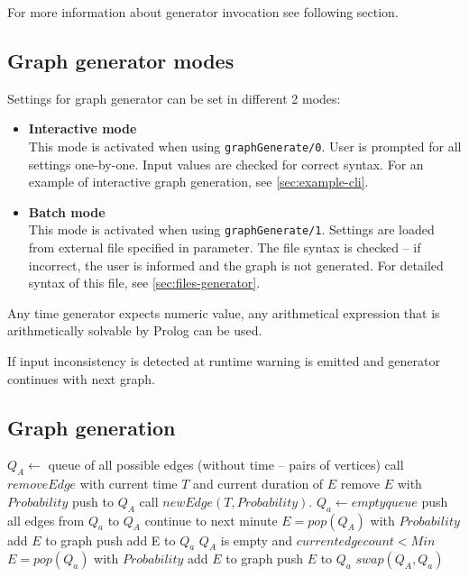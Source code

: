 \documentclass[11pt, a4paper,draft]{article}
\newcommand{\pl}[1]{\texttt{#1}} %
\theoremstyle{plain}
\theoremstyle{definition}
\theoremstyle{remark}
\begin{document}
For more information about generator invocation see following section.

\subsection{Graph generator modes}
\label{sec:generator-modes}
Settings for graph generator can be set in different 2 modes:
\begin{itemize}
\item \textbf{Interactive mode} \\
This mode is activated when using \pl{graphGenerate/0}. 
User is prompted for all settings one-by-one. Input values are checked for correct syntax. 
For an example of interactive graph generation, see \autoref{sec:example-cli}.
\item \textbf{Batch mode} \\
This mode is activated when using \pl{graphGenerate/1}. 
Settings are loaded from external file specified in parameter. 
The file syntax is checked -- if incorrect, the user is informed and the graph is not generated. 
For detailed syntax of this file, see \autoref{sec:files-generator}.
\end{itemize}

Any time generator expects numeric value, any arithmetical expression
that is arithmetically solvable by Prolog can be used.

If input inconsistency is detected at runtime warning is emitted and generator
continues with next graph.

\subsection{Graph generation}
\label{sec:generator-generation}

\begin{algorithmic}[1]
    \State $Q_A \leftarrow$ queue of all possible edges (without time -- pairs of vertices)
            \State call $removeEdge$ with current time $T$ and current duration of $E$
            \State remove $E$ with $Probability$
             push to $Q_A$ \EndIf
        \EndFor
        \State call $newEdge( T, Probability )$.
        \State $Q_a \leftarrow empty queue$
                \State push all edges from $Q_a$ to $Q_A$
                \State continue to next minute
            \EndIf
            \State $E = pop( Q_A )$
            \State with $Probability$ add $E$ to graph
             push add E to $Q_a$ \EndIf
            \If $Q_A$ is empty and $current edge count < Min$
                    \State $E = pop( Q_a )$
                    \State with $Probability$ add $E$ to graph
                     push $E$ to $Q_a$ \EndIf
                \EndWhile
            \EndIf
        \EndWhile
        \State $swap( Q_A, Q_a )$ 
    \EndFor
\end{algorithmic}
\end{document}
